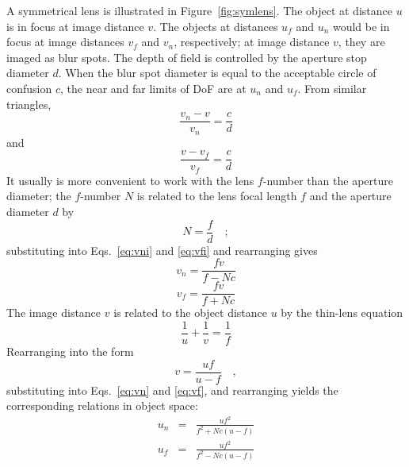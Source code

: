 \documentclass[11pt, oneside]{scrartcl}   	%
\begin{document}
A symmetrical lens is illustrated in Figure~\ref{fig:symlens}. The object at distance $u$ is in focus at image distance $v$. The objects at distances $u_f$ and $u_n$ would be in focus at image distances $v_f$ and $v_n$, respectively; at image distance $v$, they are imaged as blur spots. The depth of field is controlled by the aperture stop diameter $d$. When the blur spot diameter is equal to the acceptable circle of confusion $c$, the near and far limits of DoF are at $u_n$ and $u_f$. From similar triangles,
\begin{equation}
  \frac{v_n - v}{v_n} = \frac c d
  \label{eq:vni}
\end{equation}
and
\begin{equation}
  \frac{v - v_f}{v_f} = \frac c d
  \label{eq:vfi}
\end{equation}
It usually is more convenient to work with the lens $f$-number than the aperture diameter; the
 $f$-number $N$ is related to the lens focal length $f$ and the aperture diameter $d$ by 
 \begin{equation}
   N=\frac f d\quad ;
   \label{eq:N}
\end{equation}
  substituting into Eqs.~\ref{eq:vni} and \ref{eq:vfi} and rearranging gives
\begin{equation}
    v_n=\frac{fv}{f -N c}
  \label{eq:vn}
\end{equation}
\begin{equation}
    v_f=\frac{fv}{f + Nc}
  \label{eq:vf}
\end{equation}
The image distance $v$ is related to the object distance $u$ by the thin-lens equation
\begin{equation}
   \frac1u+\frac1v=\frac1f
   \label{eq:thinlens}
\end{equation}
Rearranging into the form 
 \begin{equation}
v=\frac{uf}{u-f}\quad,
\end{equation}
substituting into Eqs.~\ref{eq:vn} and \ref{eq:vf}, and rearranging yields the corresponding relations in object space:
\begin{eqnarray}
u_n&=&\frac{uf^2}{f^2 + Nc(u-f)}\label{eq:un}\\
u_f&=&\frac{uf^2}{f^2 - Nc(u-f)}\label{eq:uf}
   \label{eq:unf}
\end{eqnarray}
\end{document}
